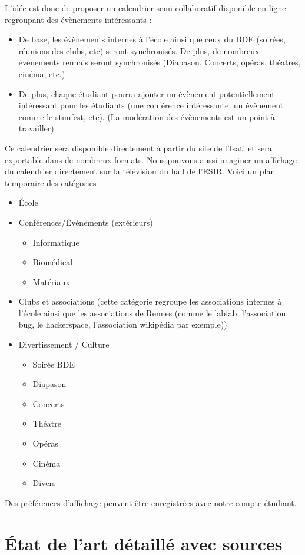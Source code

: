 \documentclass[a4paper,10pt]{article}
\begin{document}
L'idée est donc de proposer un calendrier semi-collaboratif disponible en ligne regroupant des évènements intéressants :
\begin{itemize}
  \item De base, les évènements internes à l'école ainsi que ceux du BDE  (soirées, réunions des clubs, etc) seront synchronisés. De plus, de  nombreux évènements rennais seront synchronisés (Diapason, Concerts,  opéras, théatres, cinéma, etc.)
  \item De plus, chaque étudiant pourra ajouter un évènement potentiellement  intéressant pour les étudiants (une conférence intéressante, un  évènement comme le stunfest, etc). (La modération des évènements est un point à travailler)
\end{itemize}
Ce calendrier sera disponible directement à partir du site de l'Isati et  sera exportable dans de nombreux formats. Nous pouvons aussi imaginer un  affichage du calendrier directement sur la télévision du hall de l'ESIR. 
Voici un plan temporaire des catégories
\begin{itemize}
  \item École
  \item Conférences/Évènements (extérieurs)
  \begin{itemize}
    \item Informatique
    \item Biom\'edical
    \item Mat\'eriaux
  \end{itemize}
  \item Clubs et associations (cette catégorie regroupe les associations  internes à l'école ainsi que les associations de Rennes (comme le  labfab, l'association bug, le hackerspace, l'association wikipédia par  exemple)) 
  \item Divertissement / Culture
  \begin{itemize}
    \item Soirée BDE
    \item Diapason
    \item Concerts 
    \item Théatre 
    \item Opéras 
    \item Cinéma
    \item Divers 
  \end{itemize}

\end{itemize}
Des préférences d'affichage peuvent être enregistrées avec notre compte  étudiant.
\section{État de l'art détaillé avec sources}
\end{document}
